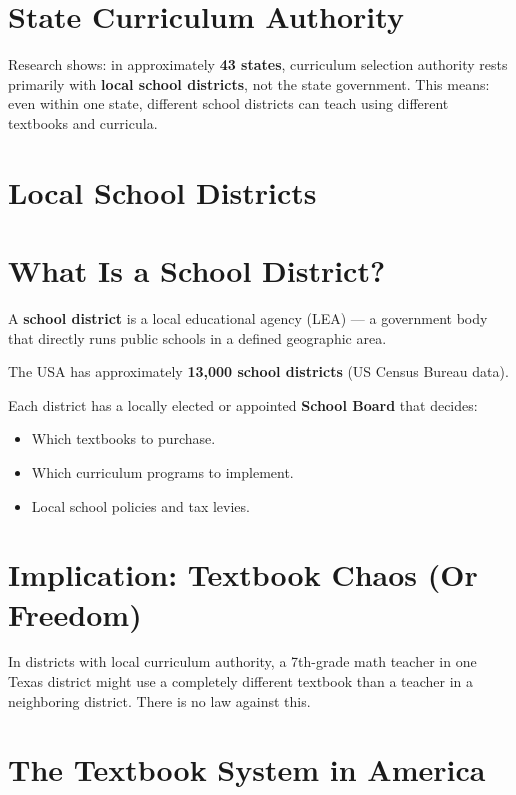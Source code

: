 \section{State Curriculum Authority}

Research shows: in approximately \textbf{43 states}, curriculum selection authority rests primarily with \textbf{local school districts}, not the state government. This means: even within one state, different school districts can teach using different textbooks and curricula.

\section{Local School Districts}

\section{What Is a School District?}

A \textbf{school district} is a local educational agency (LEA) --- a government body that directly runs public schools in a defined geographic area.

The USA has approximately \textbf{13,000 school districts} (US Census Bureau data).

Each district has a locally elected or appointed \textbf{School Board} that decides:
\begin{itemize}
	\item Which textbooks to purchase.
	\item Which curriculum programs to implement.
	\item Local school policies and tax levies.
\end{itemize}

\section{Implication: Textbook Chaos (Or Freedom)}

In districts with local curriculum authority, a 7th-grade math teacher in one Texas district might use a completely different textbook than a teacher in a neighboring district. There is no law against this.

\section{The Textbook System in America}

